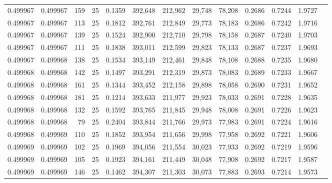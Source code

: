 \begin{tabular}{rrrrrrrrrrrrr}
0.499967 & 0.499967 &   159 &  25 &                                     0.1359 & 392,648 & 212,962 &  29,748 &  78,208 & 0.2686 & 0.7244 & 1.9727 \\
0.499967 & 0.499967 &   113 &  25 &                                     0.1812 & 392,761 & 212,849 &  29,773 &  78,183 & 0.2686 & 0.7242 & 1.9716 \\
0.499967 & 0.499967 &   139 &  25 &                                     0.1524 & 392,900 & 212,710 &  29,798 &  78,158 & 0.2687 & 0.7240 & 1.9703 \\
0.499967 & 0.499967 &   111 &  25 &                                     0.1838 & 393,011 & 212,599 &  29,823 &  78,133 & 0.2687 & 0.7237 & 1.9693 \\
0.499967 & 0.499968 &   138 &  25 &                                     0.1534 & 393,149 & 212,461 &  29,848 &  78,108 & 0.2688 & 0.7235 & 1.9680 \\
0.499968 & 0.499968 &   142 &  25 &                                     0.1497 & 393,291 & 212,319 &  29,873 &  78,083 & 0.2689 & 0.7233 & 1.9667 \\
0.499968 & 0.499968 &   161 &  25 &                                     0.1344 & 393,452 & 212,158 &  29,898 &  78,058 & 0.2690 & 0.7231 & 1.9652 \\
0.499968 & 0.499968 &   181 &  25 &                                     0.1214 & 393,633 & 211,977 &  29,923 &  78,033 & 0.2691 & 0.7228 & 1.9635 \\
0.499968 & 0.499968 &   132 &  25 &                                     0.1592 & 393,765 & 211,845 &  29,948 &  78,008 & 0.2691 & 0.7226 & 1.9623 \\
0.499968 & 0.499968 &    79 &  25 &                                     0.2404 & 393,844 & 211,766 &  29,973 &  77,983 & 0.2691 & 0.7224 & 1.9616 \\
0.499968 & 0.499969 &   110 &  25 &                                     0.1852 & 393,954 & 211,656 &  29,998 &  77,958 & 0.2692 & 0.7221 & 1.9606 \\
0.499969 & 0.499969 &   102 &  25 &                                     0.1969 & 394,056 & 211,554 &  30,023 &  77,933 & 0.2692 & 0.7219 & 1.9596 \\
0.499969 & 0.499969 &   105 &  25 &                                     0.1923 & 394,161 & 211,449 &  30,048 &  77,908 & 0.2692 & 0.7217 & 1.9587 \\
0.499969 & 0.499969 &   146 &  25 &                                     0.1462 & 394,307 & 211,303 &  30,073 &  77,883 & 0.2693 & 0.7214 & 1.9573 \\

\end{tabular}
